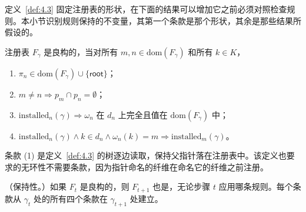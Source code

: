 定义~\ref{def:4.3} 固定注册表的形状，在下面的结果可以增加它之前必须对照检查规则。本小节识别规则保持的不变量，其第一个条款是那个形状，其余是那些结果所假设的。

\begin{definition}\label{def:4.12}
注册表 $F_\gamma$ 是良构的，当对所有 $m, n \in \mathrm{dom}(F_\gamma)$ 和所有 $k \in K$，
\begin{enumerate}
\item $\pi_n \in \mathrm{dom}(F_\gamma) \cup \{\mathsf{root}\}$；
\item $m \neq n \Rightarrow p_m \cap p_n = \emptyset$；
\item $\mathrm{installed}_n(\gamma) \Rightarrow \omega_n$ 在 $d_n$ 上完全且值在 $\mathrm{dom}(F_\gamma)$ 中；
\item $\mathrm{installed}_n(\gamma) \land k \in d_n \land \omega_n(k) = m \Rightarrow \mathrm{installed}_m(\gamma)$。
\end{enumerate}
\end{definition}

条款 (1) 是定义~\ref{def:4.3} 的树逐边读取，保持父指针落在注册表中。该定义也要求的无环性不需要条款，因为指针命名的纤维在命名它的纤维之前注册。

\begin{theorem}\label{thm:4.1}
（保持性。）如果 $F_t$ 是良构的，则 $F_{t+1}$ 也是，无论步骤 $t$ 应用哪条规则。每个条款从 $\gamma_t$ 处的所有四个条款在 $\gamma_{t+1}$ 处建立。
\end{theorem}

